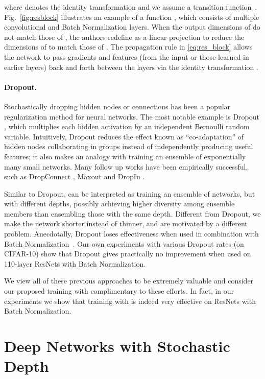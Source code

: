 \documentclass[runningheads]{llncs}
\begin{document}
where  denotes the identity transformation and we assume a  transition function~\cite{nair2010rectified}. Fig.~\ref{fig:resblock} illustrates an example of a function , which consists of multiple convolutional and Batch Normalization layers.
When the output dimensions of  do not match those of , the authors redefine  as a linear projection to reduce the dimensions of  to match those of .
The propagation rule in \eqref{eq:res_block} allows the network to pass gradients and features (from the input or those learned in earlier layers) back and forth between the layers via the identity transformation .

\paragraph{\textbf{Dropout.}} Stochastically dropping hidden nodes or connections has been a popular regularization method for neural networks. The most notable example is Dropout \cite{srivastava2014dropout}, which multiplies each hidden activation by an independent Bernoulli random variable. Intuitively, Dropout reduces the effect known as ``co-adaptation'' of hidden nodes collaborating in groups instead of independently producing useful features; it also makes an analogy with training an ensemble of exponentially many small networks. Many follow up works have been empirically successful, such as DropConnect \cite{icml2013_wan13}, Maxout \cite{goodfellow2013maxout} and DropIn \cite{smith2015gradual}.

Similar to Dropout, \name{} can be interpreted as training an ensemble of networks, but with different depths, possibly achieving higher diversity among ensemble members than ensembling those with the same depth. Different from Dropout, we make the network shorter instead of thinner, and are motivated by a different problem. Anecdotally, Dropout loses effectiveness when used in combination with Batch Normalization~\cite{ioffe2015batch,blogpostcifar10}. Our own experiments with various Dropout rates (on CIFAR-10) show that Dropout gives practically no improvement when used on 110-layer ResNets with Batch Normalization.

We view all of these previous approaches to be extremely valuable and consider our proposed training with \name{} complimentary to these efforts. In fact, in our experiments we show that training with \name{} is indeed very effective on ResNets with Batch Normalization.
 


\section{Deep Networks with Stochastic Depth}
\end{document}
